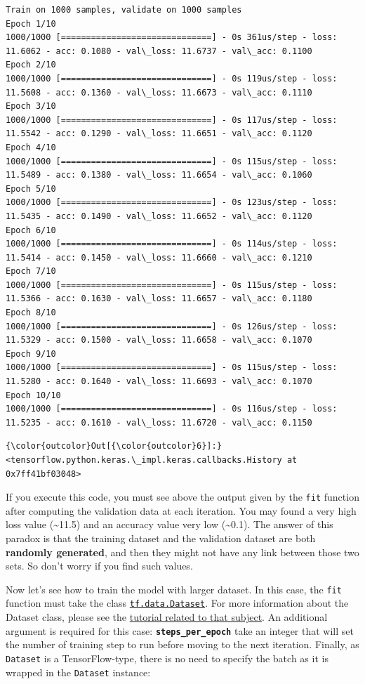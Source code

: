 \documentclass[11pt]{article}
\begin{document}
    \begin{Verbatim}[commandchars=\\\{\}]
Train on 1000 samples, validate on 1000 samples
Epoch 1/10
1000/1000 [==============================] - 0s 361us/step - loss: 11.6062 - acc: 0.1080 - val\_loss: 11.6737 - val\_acc: 0.1100
Epoch 2/10
1000/1000 [==============================] - 0s 119us/step - loss: 11.5608 - acc: 0.1360 - val\_loss: 11.6673 - val\_acc: 0.1110
Epoch 3/10
1000/1000 [==============================] - 0s 117us/step - loss: 11.5542 - acc: 0.1290 - val\_loss: 11.6651 - val\_acc: 0.1120
Epoch 4/10
1000/1000 [==============================] - 0s 115us/step - loss: 11.5489 - acc: 0.1380 - val\_loss: 11.6654 - val\_acc: 0.1060
Epoch 5/10
1000/1000 [==============================] - 0s 123us/step - loss: 11.5435 - acc: 0.1490 - val\_loss: 11.6652 - val\_acc: 0.1120
Epoch 6/10
1000/1000 [==============================] - 0s 114us/step - loss: 11.5414 - acc: 0.1450 - val\_loss: 11.6660 - val\_acc: 0.1210
Epoch 7/10
1000/1000 [==============================] - 0s 115us/step - loss: 11.5366 - acc: 0.1630 - val\_loss: 11.6657 - val\_acc: 0.1180
Epoch 8/10
1000/1000 [==============================] - 0s 126us/step - loss: 11.5329 - acc: 0.1500 - val\_loss: 11.6658 - val\_acc: 0.1070
Epoch 9/10
1000/1000 [==============================] - 0s 115us/step - loss: 11.5280 - acc: 0.1640 - val\_loss: 11.6693 - val\_acc: 0.1070
Epoch 10/10
1000/1000 [==============================] - 0s 116us/step - loss: 11.5235 - acc: 0.1610 - val\_loss: 11.6720 - val\_acc: 0.1150

    \end{Verbatim}

\begin{Verbatim}[commandchars=\\\{\}]
{\color{outcolor}Out[{\color{outcolor}6}]:} <tensorflow.python.keras.\_impl.keras.callbacks.History at 0x7ff41bf03048>
\end{Verbatim}
            
    If you execute this code, you must see above the output given by the
\texttt{fit} function after computing the validation data at each
iteration. You may found a very high loss value (\textasciitilde{}11.5)
and an accuracy value very low (\textasciitilde{}0.1). The answer of
this paradox is that the training dataset and the validation dataset are
both \textbf{randomly generated}, and then they might not have any link
between those two sets. So don't worry if you find such values.

Now let's see how to train the model with larger dataset. In this case,
the \texttt{fit} function must take the class
\href{https://www.tensorflow.org/api_docs/python/tf/data/Dataset}{\texttt{tf.data.Dataset}}.
For more information about the Dataset class, please see the
\href{https://www.tensorflow.org/guide/datasets}{tutorial related to
that subject}. An additional argument is required for this case:
\textbf{\texttt{steps\_per\_epoch}} take an integer that will set the
number of training step to run before moving to the next iteration.
Finally, as \texttt{Dataset} is a TensorFlow-type, there is no need to
specify the batch as it is wrapped in the \texttt{Dataset} instance:
\end{document}

